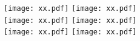 \documentclass[12pt,a5paper]{article}
\begin{document}
\pagestyle{empty}
\noindent
\texttt{[image: xx.pdf]}\hfill
\texttt{[image: xx.pdf]}\\[.5in] 
\texttt{[image: xx.pdf]}\hfill
\texttt{[image: xx.pdf]}\\[.5in]
\texttt{[image: xx.pdf]}\hfill
\texttt{[image: xx.pdf]}
\end{document}
